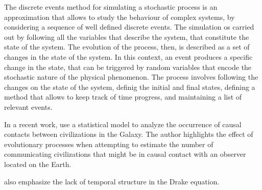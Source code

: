 \documentclass[crop]{CSLB}%
\begin{document}
The discrete events method for simulating a stochastic process is an
approximation that allows to study the behaviour of complex
systems, by considering a sequence of well defined discrete events.
%
The simulation os carried out by following all the variables that
describe the system, that constitute the state of the system.
%
The evolution of the process, then, is described as a set of changes
in the state of the system.
%
In this context, an event produces a specific change in the state,
that can be triggered by random variables that encode the stochastic
nature of the physical phenomenon.
%
The process involves following the changes on the state of the system,
definig the initial and final states, defining a method that allows to
keep track of time progress, and maintaining a list of relevant
events.


In a recent work, \citep{Balbi2018} use a statistical model to analyze
the occurrence of causal contacts between civilizations in the Galaxy.
%
The author highlights the effect of evolutionary processes when
attempting to estimate the number of communicating civilizations that
might be in causal contact with an observer located on the Earth.



\citet{cirkovic_temporal_2004} also emphasize the lack of temporal
structure in the Drake equation.



\end{document}
